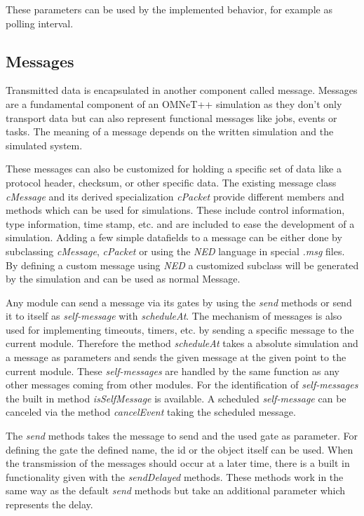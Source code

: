 These parameters can be used by the implemented behavior, for example as polling interval. \cite[section 3.6]{omnet_manual}

\subsection{Messages}
\label{sec:omnet_components_messages}
Transmitted data is encapsulated in another component called message.
Messages are a fundamental component of an OMNeT++ simulation as they don't only transport data but can also represent functional messages like jobs, events or tasks.
The meaning of a message depends on the written simulation and the simulated system. \cite[chapter 5]{omnet_manual}

These messages can also be customized for holding a specific set of data like a protocol header, checksum, or other specific data.
The existing message class \emph{cMessage} and its derived specialization \emph{cPacket} provide different members and methods which can be used for simulations.
These include control information, type information, time stamp, etc. and are included to ease the development of a simulation.
Adding a few simple datafields to a message can be either done by subclassing \emph{cMessage}, \emph{cPacket} or using the \emph{NED} language in special \emph{.msg} files.
By defining a custom message using \emph{NED} a customized subclass will be generated by the simulation and can be used as normal Message. \cite[chapter 6]{omnet_manual}

Any module can send a message via its gates by using the \emph{send} methods or send it to itself as \emph{self-message} with \emph{scheduleAt}.
The mechanism of messages is also used for implementing timeouts, timers, etc. by sending a specific message to the current module.
Therefore the method \emph{scheduleAt} takes a absolute simulation and a message as parameters and sends the given message at the given point to the current module.
These \emph{self-messages} are handled by the same function as any other messages coming from other modules.
For the identification of \emph{self-messages} the built in method \emph{isSelfMessage} is available.
A scheduled \emph{self-message} can be canceled via the method \emph{cancelEvent} taking the scheduled message. \cite[section 4.7.1]{omnet_manual}

The \emph{send} methods takes the message to send and the used gate as parameter.
For defining the gate the defined name, the id or the object itself can be used. \cite[section 4.7.2]{omnet_manual}
When the transmission of the messages should occur at a later time, there is a built in functionality given with the \emph{sendDelayed} methods.
These methods work in the same way as the default \emph{send} methods but take an additional parameter which represents the delay. \cite[section 4.7.6]{omnet_manual}

